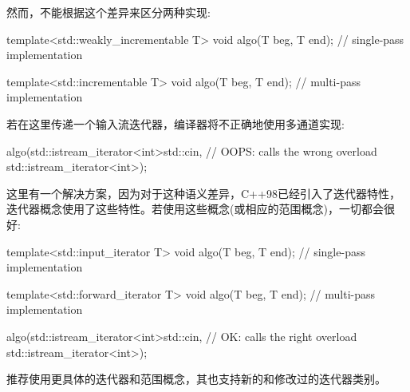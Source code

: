 然而，不能根据这个差异来区分两种实现:

\begin{cpp}
template<std::weakly_incrementable T>
void algo(T beg, T end); // single-pass implementation

template<std::incrementable T>
void algo(T beg, T end); // multi-pass implementation
\end{cpp}

若在这里传递一个输入流迭代器，编译器将不正确地使用多通道实现:

\begin{cpp}
algo(std::istream_iterator<int>{std::cin}, // OOPS: calls the wrong overload
	 std::istream_iterator<int>{});
\end{cpp}

这里有一个解决方案，因为对于这种语义差异，C++98已经引入了迭代器特性，迭代器概念使用了这些特性。若使用这些概念(或相应的范围概念)，一切都会很好:

\begin{cpp}
template<std::input_iterator T>
void algo(T beg, T end); // single-pass implementation
	
template<std::forward_iterator T>
void algo(T beg, T end); // multi-pass implementation

algo(std::istream_iterator<int>{std::cin}, // OK: calls the right overload
	std::istream_iterator<int>{});
\end{cpp}

推荐使用更具体的迭代器和范围概念，其也支持新的和修改过的迭代器类别。


















